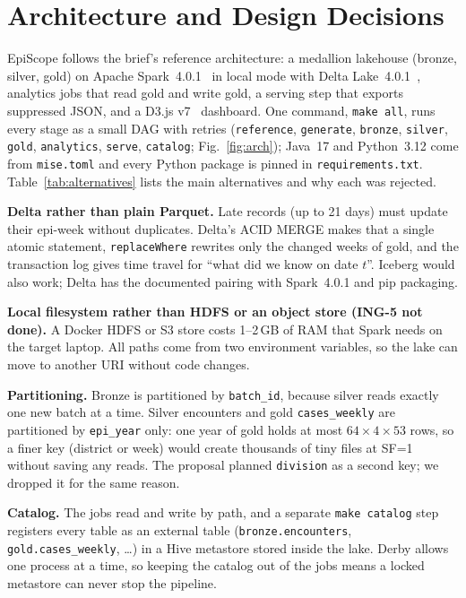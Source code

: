 \section{Architecture and Design Decisions}
EpiScope follows the brief's reference architecture: a medallion lakehouse (bronze, silver, gold) on Apache
Spark~4.0.1~\cite{zaharia2016spark} in local mode with Delta Lake~4.0.1~\cite{armbrust2020delta}, analytics
jobs that read gold and write gold, a serving step that exports suppressed JSON, and a D3.js
v7~\cite{bostock2011d3} dashboard. One command, \texttt{make all}, runs every stage as a small DAG with retries
(\texttt{reference}, \texttt{generate}, \texttt{bronze}, \texttt{silver}, \texttt{gold}, \texttt{analytics},
\texttt{serve}, \texttt{catalog}; Fig.~\ref{fig:arch}); Java~17 and Python~3.12 come from \texttt{mise.toml} and every Python package
is pinned in \texttt{requirements.txt}. Table~\ref{tab:alternatives} lists the main alternatives and why each was rejected.



\textbf{Delta rather than plain Parquet.} Late records (up to 21 days) must update their epi-week without
duplicates. Delta's ACID MERGE makes that a single atomic statement, \texttt{replaceWhere} rewrites only the
changed weeks of gold, and the transaction log gives time travel for ``what did we know on date $t$''.
Iceberg would also work; Delta has the documented pairing with Spark~4.0.1 and pip packaging.

\textbf{Local filesystem rather than HDFS or an object store (ING-5 not done).} A Docker HDFS or S3 store costs
1--2\,GB of RAM that Spark needs on the target laptop. All paths come from two environment variables, so the
lake can move to another URI without code changes.

\textbf{Partitioning.} Bronze is partitioned by \texttt{batch\_id}, because silver reads exactly one new batch
at a time. Silver encounters and gold \texttt{cases\_weekly} are partitioned by \texttt{epi\_year} only: one year
of gold holds at most $64\times4\times53$ rows, so a finer key (district or week) would create thousands of
tiny files at SF=1 without saving any reads. The proposal planned \texttt{division} as a second key; we
dropped it for the same reason.

\textbf{Catalog.} The jobs read and write by path, and a separate \texttt{make catalog} step registers every
table as an external table (\texttt{bronze.encounters}, \texttt{gold.cases\_weekly}, \dots) in a Hive
metastore stored inside the lake. Derby allows one process at a time, so keeping the catalog out of the jobs
means a locked metastore can never stop the pipeline.

